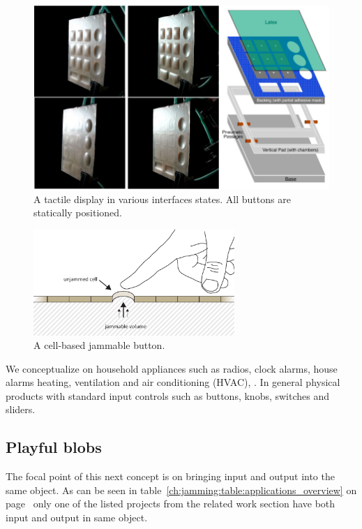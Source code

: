 \begin{figure}[h]
  \centering
      \includegraphics[width=.8\textwidth]{figures/jamming/concepts/harrisonhudson}
  \caption[A tactile display in various interfaces states. All buttons are statically positioned.]
  {A tactile display in various interfaces states. All buttons are statically positioned.}
  \label{fig:ch:jamming:concepts:harrisonhudson}
\end{figure}

\begin{figure}
  \centering
      \includegraphics[width=3in]{figures/jamming/concepts/jamming_button}
  \caption[A cell-based jammable button.]
  {A cell-based jammable button.}
  \label{fig:ch:jamming:concepts:button}
\end{figure}

We conceptualize on household appliances such as radios, clock alarms, house alarms heating, ventilation and air conditioning (HVAC), .
In general physical products with standard input controls such as buttons, knobs, switches and sliders.

\subsection{Playful blobs}
\label{ch:jamming:concepts:playful_blobs}

The focal point of this next concept is on bringing input and output into the same object.
As can be seen in table~\ref{ch:jamming:table:applications_overview} on page~\pageref{ch:jamming:table:applications_overview} only one of the listed projects from the related work section have both input and output in same object. 

